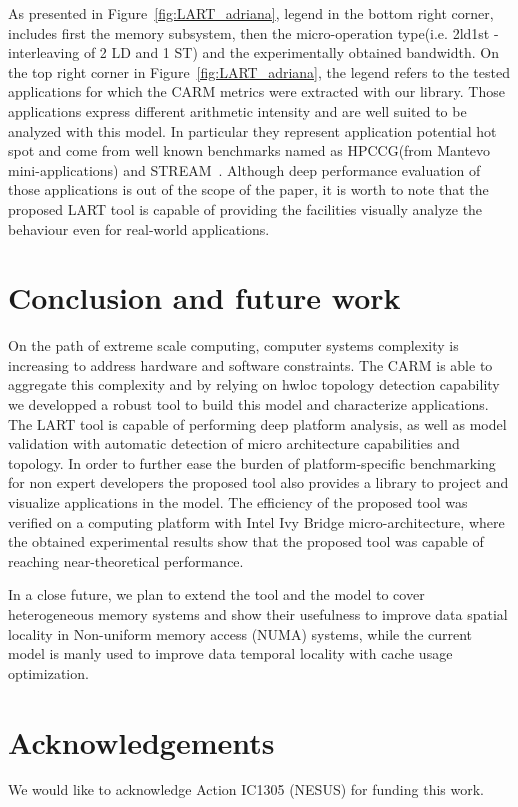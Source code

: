 \documentclass[twoside,twocolumn,9pt]{extarticle}
\begin{document}
As presented in Figure~\ref{fig:LART_adriana}, legend in the bottom right corner, includes first the memory subsystem,
then the micro-operation type(i.e. 2ld1st - interleaving of 2 LD and 1 ST) and the experimentally obtained bandwidth.
On the top right corner in Figure~\ref{fig:LART_adriana}, the legend refers to the tested applications for which the CARM metrics
were extracted with our library. Those applications express different arithmetic intensity and are well suited to be analyzed with
this model. In particular they represent application potential hot spot and come from well
known benchmarks named as HPCCG(from Mantevo~\cite{barrett2015assessing} mini-applications) and STREAM~\cite{mccalpin1995stream}.
Although deep performance evaluation of those applications is out of the scope of the
paper, it is worth to note that the proposed LART tool is capable of providing the facilities visually analyze the behaviour even
for real-world applications.

\section{Conclusion and future work}\label{sec:conclusion}

On the path of extreme scale computing, computer systems complexity is increasing to address hardware and software constraints.
The CARM is able to aggregate this complexity and by relying on hwloc topology detection capability we developped a robust tool to
build this model and characterize applications. The LART tool is capable of performing deep platform analysis,
as well as model validation with automatic detection of micro architecture capabilities and topology.
In order to further ease the burden of platform-specific benchmarking for non expert developers the proposed tool also provides a
library to project and visualize applications in the model.
The efficiency of the proposed tool was verified on a computing platform with Intel Ivy Bridge micro-architecture, where the
obtained experimental results show that the proposed tool was capable of reaching near-theoretical performance.

In a close future, we plan to extend the tool and the model to cover heterogeneous memory systems and show their usefulness to
improve data spatial locality in Non-uniform memory access (NUMA) systems, while the current model is manly used to improve data
temporal locality with cache usage optimization.

\section{Acknowledgements}\label{sec:acknowledgements}

We would like to acknowledge Action IC1305 (NESUS) for funding this work.



\end{document}
